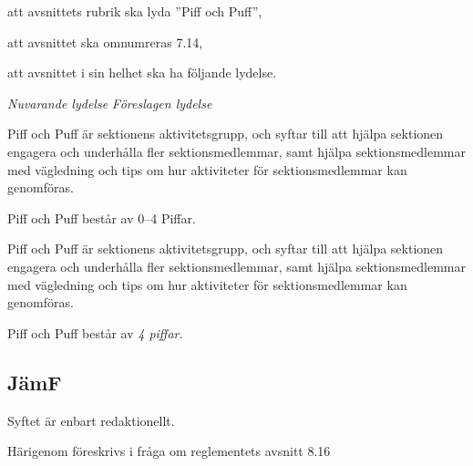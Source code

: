 \documentclass{article}
\newenvironment{lydelse}
    {\begin{paracol}{2}%
        \emph{Nuvarande lydelse}%
        \switchcolumn%
        \emph{Föreslagen lydelse}%
    \end{paracol}%
    \begin{enumerate}[label=\thesubsection.\arabic*]%
    \begin{paracol}{2}%
    }{\end{paracol}\end{enumerate}}
\begin{document}
\begin{dels}
    \item att avsnittets rubrik ska lyda ''Piff och Puff'',
    \item att avsnittet ska omnumreras 7.14,
    \item att avsnittet i sin helhet ska ha följande lydelse.
\end{dels}
\begin{lydelse}
    \setcounter{section}{8}
    \setcounter{subsection}{15}
    
    \item Piff och Puff är sektionens aktivitetsgrupp, och syftar till att hjälpa sektionen engagera och underhålla fler sektionsmedlemmar, samt hjälpa sektionsmedlemmar med vägledning och tips om hur aktiviteter för sektionsmedlemmar kan genomföras.

	\item Piff och Puff består av 0--4 Piffar.
    
    \setcounter{section}{7}
    \setcounter{subsection}{14}
    \switchcolumn
    
    \item Piff och Puff är sektionens aktivitetsgrupp, och syftar till att hjälpa sektionen engagera och underhålla fler sektionsmedlemmar, samt hjälpa sektionsmedlemmar med vägledning och tips om hur aktiviteter för sektionsmedlemmar kan genomföras.

    \item Piff och Puff består av \emph{4 piffar}.
    
\end{lydelse}

\subsection{JämF}
Syftet är enbart redaktionellt.

Härigenom föreskrivs i fråga om reglementets avsnitt 8.16
\end{document}
